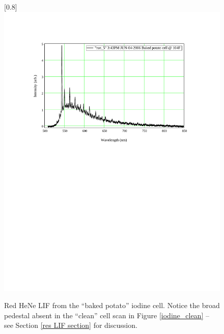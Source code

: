 \begin{figure}
\scalebox{0.8}[0.8]{
\includegraphics[bb=40 425 489 685]
{iodine_potato/iodine_potato.pdf}
}
\caption[Red HeNe LIF from the ``baked potato'' iodine cell]{Red HeNe LIF from the ``baked potato'' iodine cell. Notice the broad pedestal absent in the ``clean'' cell scan in Figure \ref{iodine_clean} -- see Section \ref{res LIF section} for discussion.}
\label{iodine_potato}
\end{figure}
